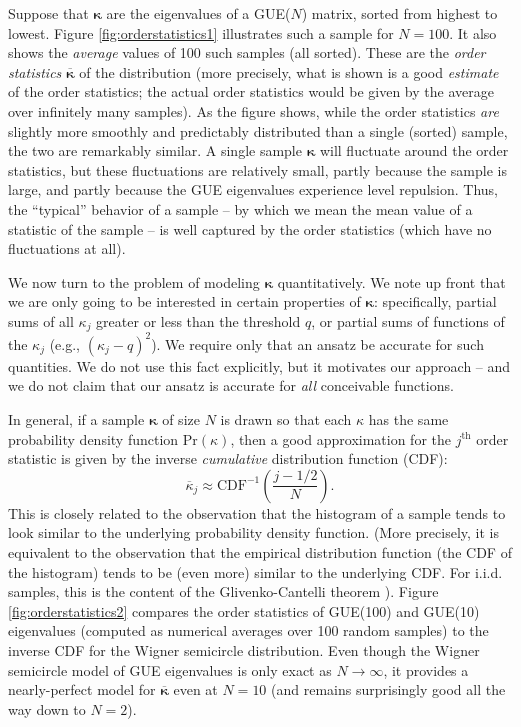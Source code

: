 \documentclass[aps,pra, twocolumn]{revtex4-1}
\newcommand{\bvec}[1]{\boldsymbol{#1}}
\begin{document}
Suppose that $\bvec{\kappa}$ are the eigenvalues of a GUE($N$) matrix, sorted from highest to lowest.  Figure \ref{fig:orderstatistics1} illustrates such a sample for $N=100$.  It also shows the \emph{average} values of 100 such samples (all sorted).  These are the \emph{order statistics} $\overline{\bvec{\kappa}}$ of the distribution (more precisely, what is shown is a good \emph{estimate} of the order statistics; the actual order statistics would be given by the average over infinitely many samples).  As the figure shows, while the order statistics \emph{are} slightly more smoothly and predictably distributed than a single (sorted) sample, the two are remarkably similar.  A single sample $\bvec{\kappa}$ will fluctuate around the order statistics, but these fluctuations are relatively small, partly because the sample is large, and partly because the GUE eigenvalues experience level repulsion.  Thus, the ``typical'' behavior of a sample -- by which we mean the mean value of a statistic of the sample -- is well captured by the order statistics (which have no fluctuations at all).

We now turn to the problem of modeling $\bvec{\kappa}$ quantitatively.  We note up front that we are only going to be interested in certain properties of $\bvec{\kappa}$:  specifically, partial sums of all $\kappa_j$ greater or less than the threshold $q$, or partial sums of functions of the $\kappa_j$ (e.g., $(\kappa_j-q)^2$).  We require only that an ansatz be accurate for such quantities.  We do not use this fact explicitly, but it motivates our approach -- and we do not claim that our ansatz is accurate for \emph{all} conceivable functions.

In general, if a sample $\bvec{\kappa}$ of size $N$ is drawn so that each $\kappa$ has the same probability density 
function $\mathrm{Pr}(\kappa)$, then a good approximation for the $j^{\mathrm{th}}$ order statistic is given by the inverse 
\emph{cumulative} distribution function (CDF):
\begin{equation}
\overline{\kappa}_j \approx \mathrm{CDF}^{-1}\left(\frac{j-1/2}{N}\right).
\end{equation}
This is closely related to the observation that the histogram of a sample tends to look similar to the underlying probability density function.  (More precisely, it is equivalent to the observation that the empirical distribution function (the CDF of the histogram) tends to be (even more) similar to the underlying CDF.  For i.i.d. samples, this is the content of the Glivenko-Cantelli theorem \cite{VanderVaart2000}).  Figure \ref{fig:orderstatistics2} compares the order statistics of GUE(100) and GUE(10) eigenvalues (computed as numerical averages over 100 random samples) to the inverse CDF for the Wigner semicircle distribution.  Even though the Wigner semicircle model of GUE eigenvalues is only exact as $N\to\infty$, it provides a nearly-perfect model for $\overline{\bvec{\kappa}}$ even at $N=10$ (and remains surprisingly good all the way down to $N=2$).
\end{document}
